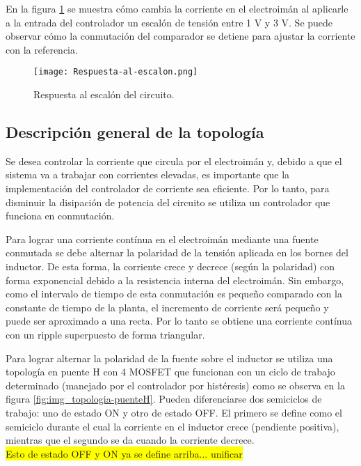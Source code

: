 \noindent En la figura \ref{fig:img_respuesta-al-escalon} se muestra cómo cambia la corriente en el electroimán al aplicarle a la entrada del controlador un escalón de tensión entre 1 V y 3 V. Se puede observar cómo la conmutación del comparador se detiene para ajustar la corriente con la referencia.

\begin{figure}[H]
	\centering
	\texttt{[image: Respuesta-al-escalon.png]}
	\caption{Respuesta al escalón del circuito.}
	\label{fig:img_respuesta-al-escalon}
\end{figure}


\subsection{Descripción general de la topología}

\noindent Se desea controlar la corriente que circula por el electroimán y, debido a que el sistema va a trabajar con corrientes elevadas, es importante que la implementación del controlador de corriente sea eficiente. Por lo tanto, para disminuir la disipación de potencia del circuito se utiliza un controlador que funciona en conmutación. 

\noindent Para lograr una corriente contínua en el electroimán mediante una fuente conmutada se debe alternar la polaridad de la tensión aplicada en los bornes del inductor. De esta forma, la corriente crece y decrece (según la polaridad) con forma exponencial debido a la resistencia interna del electroimán. Sin embargo, como el intervalo de tiempo de esta conmutación es pequeño comparado con la constante de tiempo de la planta, el incremento de corriente será pequeño y puede ser aproximado a una recta. Por lo tanto se obtiene una corriente contínua con un ripple superpuesto de forma triangular. 

\noindent Para lograr alternar la polaridad de la fuente sobre el inductor se utiliza una topología en puente H con 4 MOSFET que funcionan con un ciclo de trabajo determinado (manejado por el controlador por histéresis) como se observa en la figura \ref{fig:img_topologia-puenteH}. Pueden diferenciarse dos semiciclos de trabajo: uno de estado ON y otro de estado OFF. El primero se define como el semiciclo durante el cual la corriente en el inductor crece (pendiente positiva), mientras que el segundo se da cuando la corriente decrece.
\\
\colorbox{yellow}{Esto de estado OFF y ON ya se define arriba... unificar}

